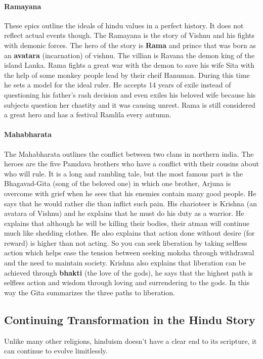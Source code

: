 \documentclass{article}
\begin{document}
\paragraph{Ramayana}
\label{par:ramayana}
These epics outline the ideals of hindu values in a perfect history. It does not reflect actual events though. The Ramayana is the story of Vishnu and his fights with demonic forces. The hero of the story is \textbf{Rama} and prince that was born as an \textbf{avatara} (incarnation) of vishnu. The villian is Ravana the demon king of the island Lanka. Rama fights a great war with the demon to save his wife Sita with the help of some monkey people lead by their cheif Hanuman. During this time he sets a model for the ideal ruler. He accepts 14 years of exile instead of questioning his father's rash decision and even exiles his beloved wife because his subjects question her chastity and it was causing unrest. Rama is still considered a great hero and has a festival Ramlila every autumn.

\paragraph{Mahabharata}
\label{par:mahabharata}
The Mahabharata outlines the conflict between two clans in northern india. The heroes are the five Pamdava brothers who have a conflict with their cousins about who will rule. It is a long and rambling tale, but the most famous part is the Bhagavad-Gita (song of the beloved one) in which one brother, Arjuna is overcome with grief when he sees that his enemies contain many good people. He says that he would rather die than inflict such pain. His charioteer is Krishna (an avatara of Vishnu) and he explains that he must do his duty as a warrior. He explains that although he will be killing their bodies, their atman will continue much like shedding clothes. He also explains that action done without desire (for reward) is higher than not acting. So you can seek liberation by taking selfless action which helps ease the tension between seeking moksha through withdrawal and the need to maintain society. Krishna also explains that liberation can be achieved through \textbf{bhakti} (the love of the gods), he says that the highest path is selfless action and wisdom through loving and surrendering to the gods. In this way the Gita summarizes the three paths to liberation.

\subsection*{Continuing Transformation in the Hindu Story}
\label{sub:continuing_transformation_in_the_hindu_story}
Unlike many other religions, hinduism doesn't have a clear end to its scripture, it can continue to evolve limitlessly.
\end{document}

